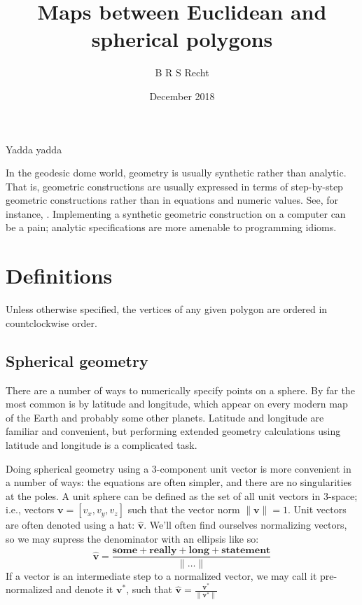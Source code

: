 \documentclass{amsart}[12pt]
\title{Maps between Euclidean and spherical polygons}
\author{B R S Recht}
\date{December 2018}
\begin{document}
\maketitle

Yadda yadda\cite{kahn}

In the geodesic dome world, geometry is usually synthetic rather than
analytic. That is, geometric constructions are usually expressed in terms of
step-by-step geometric constructions rather than in equations and numeric
values. See, for instance, \cite{kenner}. Implementing a synthetic geometric
construction on a computer can be a pain; analytic specifications are more
amenable to programming idioms.

\section{Definitions}
Unless otherwise specified, the vertices of any given polygon are ordered in
countclockwise order.

\subsection{Spherical geometry}
There are a number of ways to numerically specify points on a sphere. By far
the most common is by latitude and longitude, which appear on every modern map
of the Earth and probably some other planets. Latitude and longitude are
familiar and convenient, but performing extended geometry calculations using
latitude and longitude is a complicated task.

Doing spherical geometry using a 3-component unit vector is more convenient
in a number of ways: the equations are often simpler, and there are no
singularities at the poles. A unit sphere can be defined as the set of all unit
vectors in 3-space; i.e., vectors $\mathbf v = [v_x, v_y, v_z]$ such that the
vector norm $\|\mathbf v \|=1$. Unit vectors are often denoted using a hat:
$\hat{\mathbf v}$. We'll often find ourselves normalizing vectors,
so we may supress the denominator with an ellipsis like so:
\begin{equation}
  \hat{\mathbf v} = \frac{\mathbf{some+really+long+statement}}{\|\dots\|}
\end{equation}
If a vector is an intermediate step to a normalized vector,
we may call it pre-normalized and denote it ${\mathbf v}^*$,
such that $\hat{\mathbf v} = \frac{{\mathbf v}^*}{ \|{\mathbf v}^*\|}$
\end{document}
